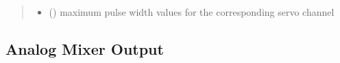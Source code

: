 \documentclass[letterpaper,10pt,english]{sphinxmanual}
\begin{document}
\begin{fulllineitems}
\begin{fulllineitems}
\begin{quote}
\begin{description}
\begin{itemize}
\item {} 
\sphinxAtStartPar
{} (\sphinxstyleliteralemphasis{\sphinxupquote{{[}}}\sphinxstyleliteralemphasis{\sphinxupquote{{]}}}) \textendash{} maximum pulse width values for the corresponding 
servo channel

\end{itemize}

\end{description}\end{quote}

\end{fulllineitems}


\end{fulllineitems}



\subsection{Analog Mixer Output}
\label{\detokenize{generic:module-AnalogMixerOutput}}\label{\detokenize{generic:analog-mixer-output}}
\end{document}
